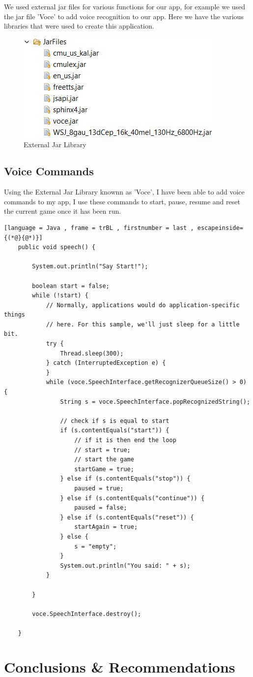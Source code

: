 \documentclass{article}
\begin{document}
We used external jar files for various functions for our app, for example we used the jar file 'Voce' to add voice recognition to our app. Here we have the various libraries that were used to create this application.

\begin{figure}[h]
    \includegraphics[scale=0.6]{img/jarfiles.png}
    \centering
    \caption{External Jar Library}
    \label{fig: A Picture of used Jar Files}
\end{figure}

\subsection{Voice Commands}

Using the External Jar Library knownn as 'Voce', I have been able to add voice commands to my app, I use these commands to start, pause, resume and reset the current game once it has been run.

\begin{lstlisting}[language = Java , frame = trBL , firstnumber = last , escapeinside={(*@}{@*)}]
	public void speech() {

		System.out.println("Say Start!");

		boolean start = false;
		while (!start) {
			// Normally, applications would do application-specific things
			// here. For this sample, we'll just sleep for a little bit.
			try {
				Thread.sleep(300);
			} catch (InterruptedException e) {
			}
			while (voce.SpeechInterface.getRecognizerQueueSize() > 0) {
				String s = voce.SpeechInterface.popRecognizedString();

				// check if s is equal to start
				if (s.contentEquals("start")) {
					// if it is then end the loop
					// start = true;
					// start the game
					startGame = true;
				} else if (s.contentEquals("stop")) {
					paused = true;
				} else if (s.contentEquals("continue")) {
					paused = false;
				} else if (s.contentEquals("reset")) {
					startAgain = true;
				} else {
					s = "empty";
				}
				System.out.println("You said: " + s);
			}

		}

		voce.SpeechInterface.destroy();

	}
\end{lstlisting}

\section{Conclusions \& Recommendations}
\end{document}
